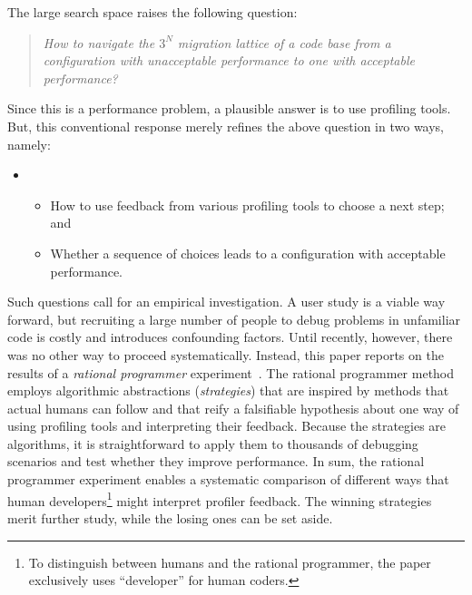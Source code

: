 The large search space raises the following question:
\begin{quote} \em
 How to navigate the $3^N$ migration lattice of a code base from a
  configuration with unacceptable performance to one with acceptable
  performance?
\end{quote}
Since this is a performance problem, a plausible answer is to use profiling tools.
But, this conventional response merely refines the above question in two
ways, namely:
\begin{itemize} \item[] \begin{itemize}\em
\item How to use feedback from various profiling tools to choose a next step; and
\item Whether a sequence of choices leads to a configuration with
  acceptable performance.
\end{itemize} \end{itemize}

Such questions call for an empirical investigation.
A user study is a viable way forward, but recruiting a large number
of people to debug problems in unfamiliar code is costly and introduces
confounding factors.
Until recently, however, there was no other way to proceed systematically.
Instead, this paper reports on the results of a \emph{rational programmer}
experiment~\cite{lksfd-popl-2020,lgfd-icfp-2021,lgfd-icfp-2023}.
The rational programmer method employs algorithmic abstractions (\emph{strategies})
that are inspired by methods that actual humans can follow and that reify a
falsifiable hypothesis about one way of using profiling tools and
interpreting their feedback.
Because the strategies are algorithms, it is straightforward to apply them
to thousands of debugging scenarios and test whether they improve performance.
In sum, the rational programmer experiment enables a systematic comparison
of different ways that human developers\footnote{To distinguish
between humans and the rational programmer, the 
paper exclusively uses ``developer'' for human coders.} might interpret profiler feedback.
The winning strategies merit further study, while the losing ones can be
set aside.

